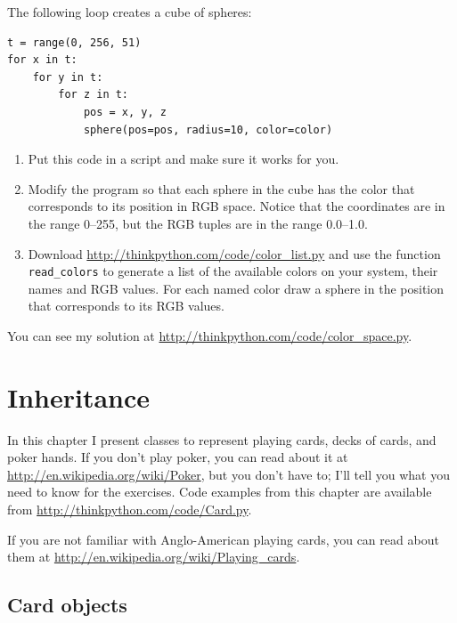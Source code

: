 \documentclass[10pt]{book}
\begin{document}
\begin{CJK}{UTF8}{gbsn}
\begin{exercise}
The following loop creates a cube of spheres:

\begin{verbatim}
t = range(0, 256, 51)
for x in t:
    for y in t:
        for z in t:
            pos = x, y, z
            sphere(pos=pos, radius=10, color=color)
\end{verbatim}

\begin{enumerate}

\item Put this code in a script and make sure it works for
you.

\item Modify the program so that each sphere in the cube
has the color that corresponds to its position in RGB space.
Notice that the coordinates are in the range 0--255, but
the RGB tuples are in the range 0.0--1.0.

\item Download \url{http://thinkpython.com/code/color_list.py}
and use the function \verb"read_colors" to generate a list
of the available colors on your system, their names and
RGB values.  For each named color draw a sphere in the
position that corresponds to its RGB values.



\end{enumerate}

You can see my solution at \url{http://thinkpython.com/code/color_space.py}.

\end{exercise}


\chapter{Inheritance}

In this chapter I present classes to represent playing cards,
decks of cards, and poker hands.  If you don't play poker, you can
read about it at \url{http://en.wikipedia.org/wiki/Poker}, but you don't have
to; I'll tell you what you need to know for the exercises.
Code examples from this chapter are available from
\url{http://thinkpython.com/code/Card.py}.

If you are not familiar with Anglo-American playing cards,
you can read about them at \url{http://en.wikipedia.org/wiki/Playing_cards}.


\section{Card objects}


\end{CJK}
\end{document}
